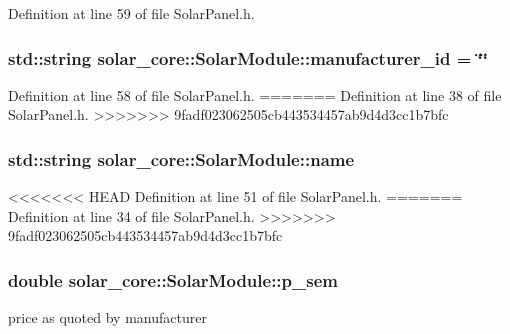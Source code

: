 Definition at line 59 of file Solar\+Panel.\+h.

\hypertarget{classsolar__core_1_1_solar_module_a24c71dfff1a0503fe967d11c52be05b8}{}
\subsubsection[{manufacturer\+\_\+id}]{\setlength{\rightskip}{0pt plus 5cm}std\+::string solar\+\_\+core\+::\+Solar\+Module\+::manufacturer\+\_\+id = \char`\"{}\char`\"{}}\label{classsolar__core_1_1_solar_module_a24c71dfff1a0503fe967d11c52be05b8}


Definition at line 58 of file Solar\+Panel.\+h.
=======
Definition at line 38 of file Solar\+Panel.\+h.
>>>>>>> 9fadf023062505cb443534457ab9d4d3cc1b7bfc

\hypertarget{classsolar__core_1_1_solar_module_abc9bb9bae1546dee017d598ef7baa952}{}
\subsubsection[{name}]{\setlength{\rightskip}{0pt plus 5cm}std\+::string solar\+\_\+core\+::\+Solar\+Module\+::name}\label{classsolar__core_1_1_solar_module_abc9bb9bae1546dee017d598ef7baa952}


<<<<<<< HEAD
Definition at line 51 of file Solar\+Panel.\+h.
=======
Definition at line 34 of file Solar\+Panel.\+h.
>>>>>>> 9fadf023062505cb443534457ab9d4d3cc1b7bfc

\hypertarget{classsolar__core_1_1_solar_module_a34233be4549eb826fa5a4cc6a20993e3}{}
\subsubsection[{p\+\_\+sem}]{\setlength{\rightskip}{0pt plus 5cm}double solar\+\_\+core\+::\+Solar\+Module\+::p\+\_\+sem}\label{classsolar__core_1_1_solar_module_a34233be4549eb826fa5a4cc6a20993e3}
price as quoted by manufacturer 

